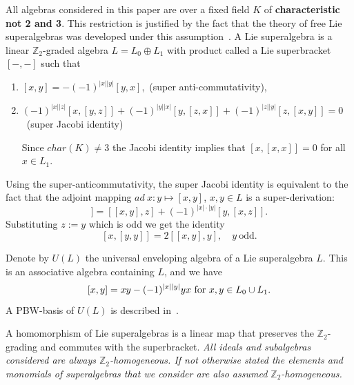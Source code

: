 \documentclass[12pt, reqno]{amsart}
\theoremstyle{remark}
\theoremstyle{definition}
\numberwithin{equation}{section}
\begin{document}
All algebras  considered in this paper are over a fixed field $K$ of {\bf characteristic  not 2 and 3}. 
This restriction is justified by the fact that
the theory of free Lie superalgebras was developed under this assumption~\cite{BMPZ}.
A Lie superalgebra is a  linear  $\mathbb{Z}_2$-graded algebra $L = L_0 \oplus L_1$ with product called a Lie superbracket $[ - , - ]$
such that
\begin{enumerate}
\item
$[x,y] = - ( -1)^{|x| |y|} [y,x]$,\  (super anti-commutativity),
\item
 $(-1)^{|x| | z|}  [x, [y,z]] + (-1)^{|y| |x|}[y, [z,x]] + (-1)^{|z| |y|} [z, [x,y]] = 0$\  (super Jacobi identity)
 
 
 
Since $char(K) \not= 3$ the Jacobi identity implies that $[x, [x,x]] = 0$ for all $x \in L_1$.


\end{enumerate}


Using the super-anticommutativity, the super Jacobi identity is equivalent to the fact that the adjoint mapping  $ad \ x: y\mapsto [x,y]$, $x,y\in L$ is a super-derivation:
\begin{equation*} 
[x,[y,z]]=[[x,y],z]+(-1)^{|x|\cdot |y|} [y,[x,z]]. 
\end{equation*}
Substituting $z:=y$ which is odd we get the identity
\begin{equation}\label{odd} 
[x,[y,y]]=2 [[x,y],y],\quad y \ \text{odd}.  
\end{equation}

Denote by $U(L)$ the universal enveloping algebra of a Lie superalgebra $L$.  This is an associative algebra containing $L$, and we have
\begin{equation} \label{super-bracket}  [x,y] = x y - (-1)^{|x| | y |} yx \hbox{ for } x,y \in L_0 \cup L_1. \end{equation}
A PBW-basis of  $U(L)$ is described in~\cite{BMPZ}.

A homomorphism of Lie superalgebras is a linear map that preserves the $\mathbb{Z}_2$-grading and commutes with the superbracket.
{\it All ideals and subalgebras considered are always $\mathbb Z_2$-homogeneous.
If not otherwise stated  the elements and monomials of superalgebras that we consider are also assumed $\mathbb Z_2$-homogeneous.} 
\end{document}
